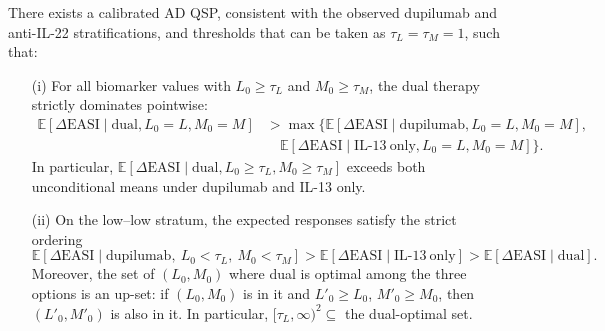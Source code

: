 \begin{theorem}\label{thm:dual-dominance-upset}
There exists a calibrated AD QSP, consistent with the observed dupilumab and anti-IL-22 stratifications, and thresholds that can be taken as $\tau_L=\tau_M=1$, such that:
\begin{itemize}
  \item[(i)] For all biomarker values with $L_0\ge\tau_L$ and $M_0\ge\tau_M$, the dual therapy strictly dominates pointwise:
  \[
  \begin{aligned}
  \mathbb{E}[\Delta\mathrm{EASI}\mid \mathrm{dual},L_0{=}L,M_0{=}M]
  &> \max\{\mathbb{E}[\Delta\mathrm{EASI}\mid \mathrm{dupilumab},L_0{=}L,M_0{=}M],\\
  &\quad\mathbb{E}[\Delta\mathrm{EASI}\mid \mathrm{IL\text{-}13\ only},L_0{=}L,M_0{=}M]\}.
  \end{aligned}
  \]
  In particular, $\mathbb{E}[\Delta\mathrm{EASI}\mid \mathrm{dual},L_0\ge\tau_L,M_0\ge\tau_M]$ exceeds both unconditional means under dupilumab and IL-13 only.
  \item[(ii)] On the low--low stratum, the expected responses satisfy the strict ordering
  \[
  \mathbb{E}[\Delta\mathrm{EASI}\mid \mathrm{dupilumab},\ L_0<\tau_L,\ M_0<\tau_M]
  > \mathbb{E}[\Delta\mathrm{EASI}\mid \mathrm{IL\text{-}13\ only}]
  > \mathbb{E}[\Delta\mathrm{EASI}\mid \mathrm{dual}].
  \]
  Moreover, the set of $(L_0,M_0)$ where dual is optimal among the three options is an up-set: if $(L_0,M_0)$ is in it and $L'_0\ge L_0$, $M'_0\ge M_0$, then $(L'_0,M'_0)$ is also in it. In particular, $[\tau_L,\infty)^2\subseteq$ the dual-optimal set.
\end{itemize}
\end{theorem}

